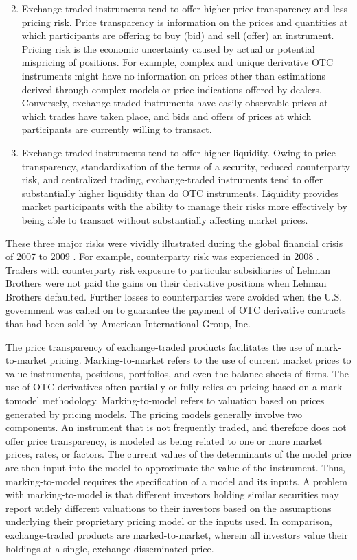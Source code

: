 \documentclass[11pt]{article}
\begin{document}
\begin{enumerate}
  \setcounter{enumi}{1}
  \item Exchange-traded instruments tend to offer higher price transparency and less pricing risk. Price transparency is information on the prices and quantities at which participants are offering to buy (bid) and sell (offer) an instrument. Pricing risk is the economic uncertainty caused by actual or potential mispricing of positions. For example, complex and unique derivative OTC instruments might have no information on prices other than estimations derived through complex models or price indications offered by dealers. Conversely, exchange-traded instruments have easily observable prices at which trades have taken place, and bids and offers of prices at which participants are currently willing to transact.

  \item Exchange-traded instruments tend to offer higher liquidity. Owing to price transparency, standardization of the terms of a security, reduced counterparty risk, and centralized trading, exchange-traded instruments tend to offer substantially higher liquidity than do OTC instruments. Liquidity provides market participants with the ability to manage their risks more effectively by being able to transact without substantially affecting market prices.

\end{enumerate}

These three major risks were vividly illustrated during the global financial crisis of 2007 to 2009 . For example, counterparty risk was experienced in 2008 . Traders with counterparty risk exposure to particular subsidiaries of Lehman Brothers were not paid the gains on their derivative positions when Lehman Brothers defaulted. Further losses to counterparties were avoided when the U.S. government was called on to guarantee the payment of OTC derivative contracts that had been sold by American International Group, Inc.

The price transparency of exchange-traded products facilitates the use of mark-to-market pricing. Marking-to-market refers to the use of current market prices to value instruments, positions, portfolios, and even the balance sheets of firms. The use of OTC derivatives often partially or fully relies on pricing based on a mark-tomodel methodology. Marking-to-model refers to valuation based on prices generated by pricing models. The pricing models generally involve two components. An instrument that is not frequently traded, and therefore does not offer price transparency, is modeled as being related to one or more market prices, rates, or factors. The current values of the determinants of the model price are then input into the model to approximate the value of the instrument. Thus, marking-to-model requires the specification of a model and its inputs. A problem with marking-to-model is that different investors holding similar securities may report widely different valuations to their investors based on the assumptions underlying their proprietary pricing model or the inputs used. In comparison, exchange-traded products are marked-to-market, wherein all investors value their holdings at a single, exchange-disseminated price.
\end{document}
